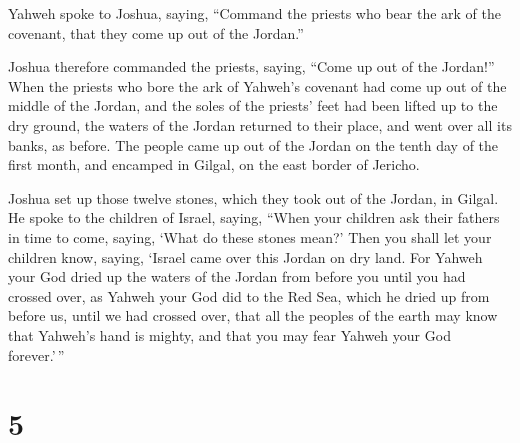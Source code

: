  Yahweh spoke to Joshua, saying, 
``Command the priests who bear the ark of the covenant, that they come
up out of the Jordan.''

 Joshua therefore commanded the priests, saying, ``Come
up out of the Jordan!''  When the priests who bore the
ark of Yahweh's covenant had come up out of the middle of the Jordan,
and the soles of the priests' feet had been lifted up to the dry ground,
the waters of the Jordan returned to their place, and went over all its
banks, as before.  The people came up out of the Jordan
on the tenth day of the first month, and encamped in Gilgal, on the east
border of Jericho.

 Joshua set up those twelve stones, which they took out
of the Jordan, in Gilgal.  He spoke to the children of
Israel, saying, ``When your children ask their fathers in time to come,
saying, `What do these stones mean?'  Then you shall let
your children know, saying, `Israel came over this Jordan on dry land.
 For Yahweh your God dried up the waters of the Jordan
from before you until you had crossed over, as Yahweh your God did to
the Red Sea, which he dried up from before us, until we had crossed
over,  that all the peoples of the earth may know that
Yahweh's hand is mighty, and that you may fear Yahweh your God
forever.'\,''

\hypertarget{section-4}{%
\section{5}\label{section-4}}

